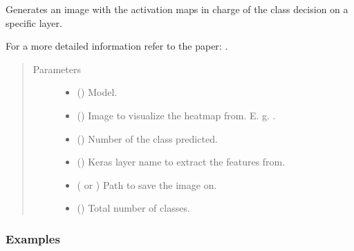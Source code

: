 \documentclass[letterpaper,10pt,english]{sphinxmanual}
\begin{document}
\begin{fulllineitems}
\label{\detokenize{utils/grad_cam:utils.grad_cam.grad_cam_sample}}
Generates an image with the activation maps in charge of the class decision on a specific layer.

For a more detailed information refer to the paper: .
\begin{quote}\begin{description}
\item[{Parameters}] \leavevmode\begin{itemize}
\item {} 
 () \textendash{} Model.

\item {} 
 () \textendash{} Image to visualize the heatmap from. E. g. .

\item {} 
 () \textendash{} Number of the class predicted.

\item {} 
 () \textendash{} Keras layer name to extract the features from.

\item {} 
 ( or ) \textendash{} Path to save the image on.

\item {} 
 () \textendash{} Total number of classes.

\end{itemize}

\end{description}\end{quote}
\subsubsection*{Examples}


\end{fulllineitems}
\end{document}
